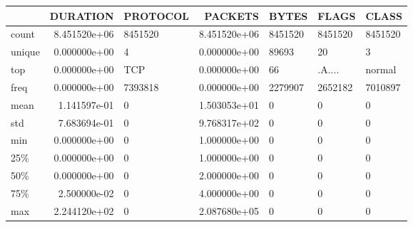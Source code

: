 \begin{tabular}{lrlrlll}
\toprule
{} &      DURATION & PROTOCOL &       PACKETS &     BYTES &    FLAGS &    CLASS \\
\midrule
count  &  8.451520e+06 &  8451520 &  8.451520e+06 &   8451520 &  8451520 &  8451520 \\
unique &  0.000000e+00 &        4 &  0.000000e+00 &     89693 &       20 &        3 \\
top    &  0.000000e+00 &    TCP   &  0.000000e+00 &        66 &   .A.... &   normal \\
freq   &  0.000000e+00 &  7393818 &  0.000000e+00 &   2279907 &  2652182 &  7010897 \\
mean   &  1.141597e-01 &        0 &  1.503053e+01 &         0 &        0 &        0 \\
std    &  7.683694e-01 &        0 &  9.768317e+02 &         0 &        0 &        0 \\
min    &  0.000000e+00 &        0 &  1.000000e+00 &         0 &        0 &        0 \\
25\%    &  0.000000e+00 &        0 &  1.000000e+00 &         0 &        0 &        0 \\
50\%    &  0.000000e+00 &        0 &  2.000000e+00 &         0 &        0 &        0 \\
75\%    &  2.500000e-02 &        0 &  4.000000e+00 &         0 &        0 &        0 \\
max    &  2.244120e+02 &        0 &  2.087680e+05 &         0 &        0 &        0 \\
\bottomrule
\end{tabular}

